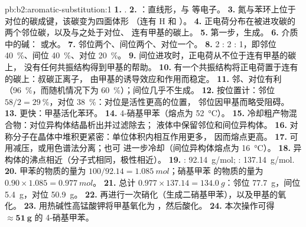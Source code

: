 \begin{solution}{pb:b2:aromatic-substitution:1}
\textbf{1.} .
\textbf{2.} ：直线形，与  等电子。
\textbf{3.} 氮与苯环上位于  对位的碳成键，该碳变为四面体形
（连有 H 和 ）。
\textbf{4.} 正电荷分布在被进攻碳的两个邻位碳，以及与之处于对位、
连有甲基的碳上。
\textbf{5.} 第一步，生成。
\textbf{6.} 介质中的碱： 或水。
\textbf{7.} 邻位两个、间位两个、对位一个。
\textbf{8.} 2 : 2 : 1，即邻位 40~\%、间位 40~\%、对位 20~\%。
\textbf{9.} 间位进攻时，正电荷从不位于连有甲基的碳上，
没有任何共振结构得到甲基的帮助。
\textbf{10.} 有一个共振结构将正电荷置于连有  的碳上：叔碳正离子，
由甲基的诱导效应和作用而稳定。
\textbf{11.} 邻、对位有利（96~\%，而随机情况下为 60~\%）；间位几乎不生成。
\textbf{12.} 按位置计：邻位 $58/2 = 29~\%$，对位 38~\%：对位是活性更高的位置，
邻位因甲基而略受阻碍。
\textbf{13.} 更快：甲基活化苯环。
\textbf{14.} 4-硝基甲苯（熔点为 \qty{52}{\degreeCelsius}）。
\textbf{15.} 冷却粗产物混合物：对位异构体结晶析出并过滤除去；
液体中保留邻位和间位异构体。
\textbf{16.} 对称分子在晶体中堆积更紧密：单位体积内相互作用更多，
因而熔点更高。
\textbf{17.} 可用减压，或用色谱法分离；也可
进一步冷却（间位异构体熔点为 \qty{16}{\degreeCelsius}）。
\textbf{18.} 异构体的沸点相近（分子式相同，极性相近）。
\textbf{19.} : \qty{92.14}{g/mol}; : \qty{137.14}{g/mol}.
\textbf{20.} 甲苯的物质的量为 $100/92.14 = \qty{1.085}{mol}$；硝基甲苯
的物质的量为 $0.90 \times 1.085 = \qty{0.977}{mol}$。
\textbf{21.} 总计 $0.977 \times 137.14 = \qty{134.0}{g}$：邻位 \qty{77.7}{g}，间位
\qty{5.4}{g}，对位 \qty{50.9}{g}。
\textbf{22.} 再进行一次硝化（生成二硝基甲苯），以及甲基的氧化。
\textbf{23.} 用热碱性高锰酸钾将甲基氧化为 ，然后酸化。
\textbf{24.} 本次操作可得 $\boldsymbol{\approx \qty{51}{g}}$ 的 4-硝基甲苯。
\end{solution}
